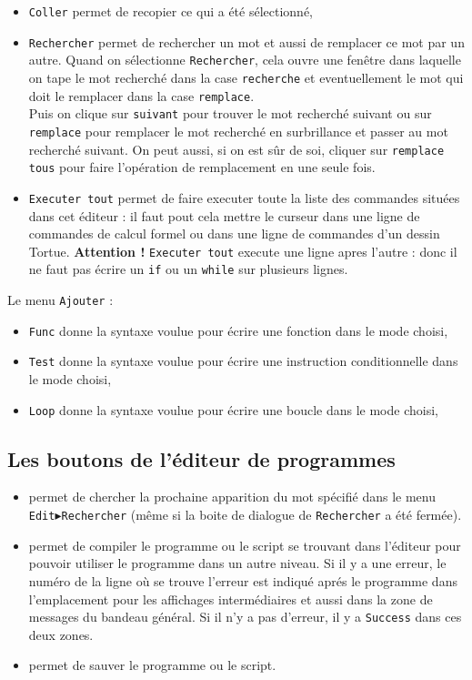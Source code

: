 \documentclass[a4paper,11pt]{article}
\begin{document}
\begin{itemize}
\item {\tt Coller} permet de recopier ce qui a \'et\'e s\'electionn\'e,
\item {\tt Rechercher} permet de rechercher un mot et aussi de remplacer ce mot par un autre. Quand on s\'electionne {\tt Rechercher}, cela ouvre une fen\^etre
dans laquelle on tape le mot recherch\'e dans la case {\tt recherche}
et eventuellement le mot qui doit le remplacer dans la case {\tt remplace}. \\
Puis on clique sur {\tt suivant} pour trouver le mot recherch\'e suivant ou 
sur {\tt remplace} pour remplacer le mot recherch\'e en surbrillance et passer 
au mot recherch\'e suivant. On peut aussi, si on est s\^ur de soi, cliquer sur 
{\tt remplace tous} pour faire l'op\'eration de remplacement en une seule fois.
\item {\tt Executer tout} permet de faire executer toute
la liste des commandes situ\'ees dans cet \'editeur : il faut pout cela mettre 
le curseur dans une ligne de commandes de calcul formel ou dans une 
ligne de commandes d'un dessin Tortue.
{\bf Attention !} {\tt Executer tout} execute une ligne apres l'autre : donc 
il ne faut pas \'ecrire un {\tt if} ou un {\tt while} sur plusieurs lignes.
\end{itemize} 
Le menu {\tt Ajouter} :
\begin{itemize}
\item {\tt Func} donne la syntaxe voulue pour \'ecrire une fonction dans le 
mode choisi,
\item {\tt Test} donne la syntaxe voulue pour \'ecrire une instruction 
conditionnelle dans le mode choisi,
\item  {\tt Loop} donne la syntaxe voulue pour \'ecrire une boucle dans le 
mode choisi,
\end{itemize} 
\subsection{Les boutons de l'\'editeur de programmes}
\begin{itemize}
\item {} permet de chercher la prochaine apparition du mot
sp\'ecifi\'e dans le menu {\tt Edit$\blacktriangleright$Rechercher} (m\^eme si 
la boite de dialogue de {\tt Rechercher} a \'et\'e ferm\'ee).
\item {} permet de compiler le programme ou le script se 
trouvant dans l'\'editeur pour pouvoir utiliser le programme dans un autre 
niveau. Si il y a une erreur, le num\'ero de la ligne o\`u se
trouve l'erreur est indiqu\'e apr\'es le programme dans l'emplacement pour les 
affichages interm\'ediaires et aussi dans la zone de messages 
du bandeau g\'en\'eral. Si il n'y a pas d'erreur, il y a {\tt Success} dans ces
deux zones.

\item {} permet de sauver le programme ou le script.
\end{itemize}
\end{document}
